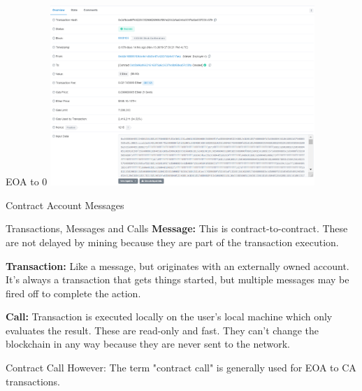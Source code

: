 \documentclass[handout]{beamer}
\begin{document}
\begin{frame}{EOA to 0}
\center
\includegraphics[width=10cm]{../assets/images/EOA_to_0}


\end{frame}

\begin{frame}{Contract Account Messages}

\end{frame}

\begin{frame}{Transactions, Messages and Calls}
\textbf{Message:} This is contract-to-contract. These are not delayed by mining because they are part of the transaction execution.
\vspace{1em}

\textbf{Transaction:} Like a message, but originates with an externally owned account. It's always a transaction that gets things started, but multiple messages may be fired off to complete the action.
\vspace{1em}

\textbf{Call:} Transaction is executed locally on the user's local machine which only evaluates the result. These are read-only and fast. They can't change the blockchain in any way because they are never sent to the network. 


\vspace{1em}

\begin{alertblock}{Contract Call}
				However: The term "contract call" is generally used for EOA to CA transactions.
			\end{alertblock}

\end{frame}
\end{document}
